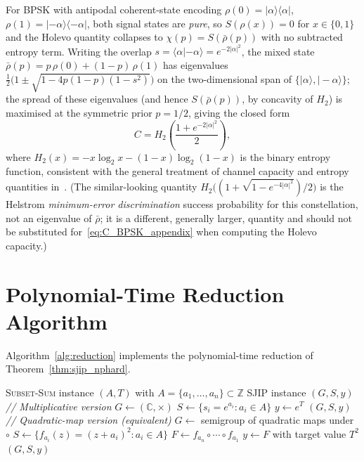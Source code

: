 \documentclass[journal,twocolumn]{IEEEtran}
\theoremstyle{definition}
\theoremstyle{plain}
\newcommand{\C}{\mathbb{C}}
\newcommand{\Z}{\mathbb{Z}}
\begin{document}
For BPSK with antipodal coherent-state encoding
$\rho(0)=|\alpha\rangle\langle\alpha|$,
$\rho(1)=|-\alpha\rangle\langle-\alpha|$, both signal states are
\emph{pure}, so $S(\rho(x))=0$ for $x\in\{0,1\}$ and the Holevo
quantity collapses to $\chi(p) = S(\bar\rho(p))$ with no subtracted
entropy term. Writing the overlap $s = \langle\alpha|{-\alpha}\rangle
= e^{-2|\alpha|^2}$, the mixed state $\bar\rho(p) =
p\,\rho(0)+(1-p)\,\rho(1)$ has eigenvalues $\tfrac12\bigl(1\pm
\sqrt{1-4p(1-p)(1-s^2)}\bigr)$ on the two-dimensional span of
$\{|\alpha\rangle,|-\alpha\rangle\}$; the spread of these eigenvalues
(and hence $S(\bar\rho(p))$, by concavity of $H_2$) is maximised at
the symmetric prior $p=1/2$, giving the closed form
\begin{equation}
  C = H_2\!\left(\frac{1+e^{-2|\alpha|^2}}{2}\right),
  \label{eq:C_BPSK_appendix}
\end{equation}
where $H_2(x) = -x\log_2 x - (1-x)\log_2(1-x)$ is the binary entropy
function, consistent with the general treatment of channel capacity
and entropy quantities in~\cite{cover2006}. (The similar-looking
quantity $H_2\bigl((1+\sqrt{1-e^{-4|\alpha|^2}})/2\bigr)$ is the
Helstrom \emph{minimum-error discrimination} success probability for
this constellation, not an eigenvalue of $\bar\rho$; it is a
different, generally larger, quantity and should not be substituted
for~\eqref{eq:C_BPSK_appendix} when computing the Holevo capacity.)

\section{Polynomial-Time Reduction Algorithm}
\label{app:reduction}

Algorithm~\ref{alg:reduction} implements the polynomial-time
reduction of Theorem~\ref{thm:sjip_nphard}.

\begin{algorithm}[H]
\caption{Polynomial-Time Reduction: \textsc{Subset-Sum} to SJIP}
\label{alg:reduction}
\begin{algorithmic}[1]
\Require \textsc{Subset-Sum} instance $(A, T)$ with
         $A = \{a_1,\ldots,a_n\} \subset \Z$
\Ensure SJIP instance $(G, S, y)$
\State \textit{// Multiplicative version}
\State $G \leftarrow (\C, \times)$
\State $S \leftarrow \{s_i = e^{a_i} : a_i \in A\}$
\State $y \leftarrow e^T$
\Return $(G, S, y)$
\State \textit{// Quadratic-map version (equivalent)}
\State $G \leftarrow$ semigroup of quadratic maps under $\circ$
\State $S \leftarrow \{f_{a_i}(z) = (z+a_i)^2 : a_i \in A\}$
\State $F \leftarrow f_{a_n} \circ \cdots \circ f_{a_1}$
\State $y \leftarrow F$ with target value $T^2$
\Return $(G, S, y)$
\end{algorithmic}
\end{algorithm}
\end{document}

